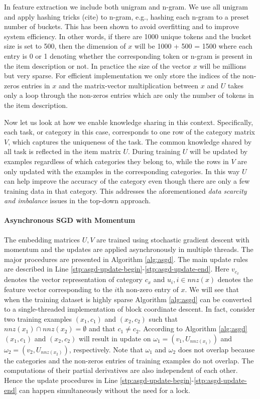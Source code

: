 In feature extraction we include both unigram and n-gram. We use all unigram and apply hashing tricks (cite) to n-gram, e.g., hashing each n-gram to a preset number of buckets. This has been shown to avoid overfitting and to improve system efficiency. In other words, if there are 1000 unique tokens and the bucket size is set to 500, then the dimension of $x$ will be 1000 + 500 = 1500 where each entry is 0 or 1 denoting whether the corresponding token or n-gram is present in the item description or not. In practice the size of the vector $x$ will be millions but very sparse. For efficient implementation we only store the indices of the non-zeros entries in $x$ and the matrix-vector multiplication between $x$ and $U$ takes only a loop through the non-zeros entries which are only the number of tokens in the item description. 

Now let us look at how we enable knowledge sharing in this context. Specifically, each task, or category in this case, corresponds to one row of the category matrix $V$, which captures the uniqueness of the task. The common knowledge shared by all task is reflected in the item matrix $U$. During training $U$ will be updated by examples regardless of which categories they belong to, while the rows in $V$ are only updated with the examples in the corresponding categories. In this way $U$ can help improve the accuracy of the category even though there are only a few training data in that category. This addresses the aforementioned \emph{data scarcity and imbalance} issues in the top-down approach.

\paragraph{Asynchronous SGD with Momentum}
The embedding matrices $U, V$ are trained using stochastic gradient descent with momentum and the updates are applied asynchronously in multiple threads. 
The major procedures are presented in Algorithm \ref{alg:asgd}. 
The main update rules are described in Line \ref{stp:asgd-update-begin}-\ref{stp:asgd-update-end}. 
Here $v_{c_x}$ denotes the vector representation of category $c_x$ and $u_i, i \in nnz(x)$ denotes the feature vector corresponding to the $i$th non-zero entry of $x$.
We will see that when the training dataset is highly sparse Algorithm \ref{alg:asgd} can be converted to a single-threaded implementation of block coordinate descent. In fact, consider two training examples $(x_1, c_1)$ and $(x_2, c_2)$ such that $nnz(x_1) \cap nnz(x_2) = \emptyset$ and that $c_1 \neq c_2$. According to Algorithm \ref{alg:asgd} $(x_1, c_1)$ and $(x_2, c_2)$ will result in update on $\omega_1 = (v_1, U_{nnz(x_1)})$ and $\omega_2 = (v_2, U_{nnz(x_2)})$, respectively. Note that $\omega_1$ and $\omega_2$ does not overlap because the categories and the non-zeros entries of training examples do not overlap. The computations of their partial derivatives are also independent of each other. 
Hence the update procedures in Line \ref{stp:asgd-update-begin}-\ref{stp:asgd-update-end} can happen simultaneously without the need for a lock.


